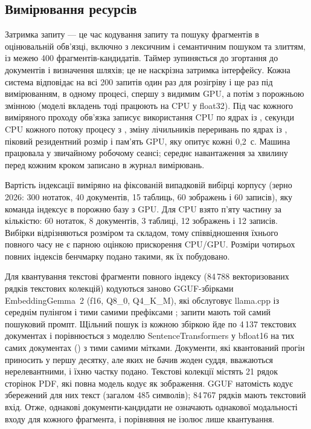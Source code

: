 \subsection{Вимірювання ресурсів}
Затримка запиту --- це час кодування запиту та пошуку фрагментів в оцінювальній обв'язці, включно з лексичним і семантичним пошуком та злиттям, із межею 400 фрагментів-кандидатів. Таймер зупиняється до згортання до документів і визначення шляхів; це не наскрізна затримка інтерфейсу. Кожна система відповідає на всі 200 запитів один раз для розігріву і ще раз під вимірюванням, в одному процесі, спершу з видимим GPU, а потім з порожньою змінною  (моделі вкладень тоді працюють на CPU у float32). Під час кожного виміряного проходу обв'язка записує використання CPU по ядрах із , секунди CPU кожного потоку процесу з , зміну лічильників переривань по ядрах із , піковий резидентний розмір і пам'ять GPU, яку  опитує кожні 0,2~с. Машина працювала у звичайному робочому сеансі; середнє навантаження за хвилину перед кожним кроком записано в журнал вимірювань.

Вартість індексації виміряно на фіксованій випадковій вибірці корпусу (зерно 2026: 300 нотаток, 40 документів, 15 таблиць, 60 зображень і 60 записів), яку команда  індексує в порожню базу з GPU. Для CPU взято п’яту частину за кількістю: 60 нотаток, 8 документів, 3 таблиці, 12 зображень і 12 записів. Вибірки відрізняються розміром та складом, тому співвідношення їхнього повного часу не є парною оцінкою прискорення CPU/GPU. Розміри чотирьох повних індексів бенчмарку подано такими, як їх побудовано.

Для квантування текстові фрагменти повного індексу (84\,788 векторизованих рядків текстових колекцій) кодуються заново GGUF-збірками EmbeddingGemma~2 (f16, Q8\_0, Q4\_K\_M), які обслуговує llama.cpp із середнім пулінгом і тими самими префіксами ; запити мають той самий пошуковий промпт. Щільний пошук із кожною збіркою йде по 4\,137 текстових документах і порівнюється з моделлю SentenceTransformers у bfloat16 на тих самих документах () з тими самими мітками. Документи, які квантований прогін приносить у першу десятку, але яких не бачив жоден суддя, вважаються нерелевантними, і їхню частку подано. Текстові колекції містять 21 рядок сторінок PDF, які повна модель кодує як зображення. GGUF натомість кодує збережений для них текст (загалом 485 символів); 84\,767 рядків мають текстовий вхід. Отже, однакові документи-кандидати не означають однакової модальності входу для кожного фрагмента, і порівняння не ізолює лише квантування.

